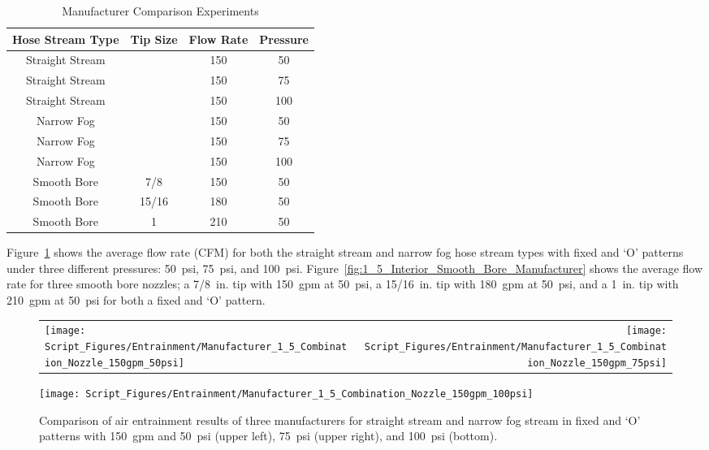 \documentclass[12pt,oneside]{book}
\begin{document}
\begin{table}[!ht]
\centering
\caption{Manufacturer Comparison Experiments}
\label{tab:Manufacturer_Comparison_Experiments}
\begin{tabular}{cccc}
\toprule[1.5pt]
Hose Stream Type & Tip Size & Flow Rate & Pressure \\ 
\midrule
Straight Stream &       & 150 & 50 \\
Straight Stream &       & 150 & 75 \\
Straight Stream &       & 150 & 100 \\
Narrow Fog      &       & 150 & 50 \\
Narrow Fog      &       & 150 & 75 \\
Narrow Fog      &       & 150 & 100 \\
Smooth Bore     & 7/8   & 150 & 50 \\
Smooth Bore     & 15/16 & 180 & 50 \\
Smooth Bore     & 1     & 210 & 50 \\
\bottomrule[1.25pt]
\end{tabular}
\end{table}

Figure~\ref{fig:1_5_Interior_Combination_Manufacturer} shows the average flow rate (CFM) for both the straight stream and narrow fog hose stream types with fixed and `O' patterns under three different pressures: 50~psi, 75~psi, and 100~psi. Figure~\ref{fig:1_5_Interior_Smooth_Bore_Manufacturer} shows the average flow rate for three smooth bore nozzles; a 7/8~in. tip with 150~gpm at 50~psi, a 15/16~in. tip with 180~gpm at 50~psi, and a 1~in. tip with 210~gpm at 50~psi for both a fixed and `O' pattern.

\begin{figure}[!ht]
\begin{tabular*}{\textwidth}{lr}
\texttt{[image: Script\_Figures/Entrainment/Manufacturer\_1\_5\_Combination\_Nozzle\_150gpm\_50psi]} &
\texttt{[image: Script\_Figures/Entrainment/Manufacturer\_1\_5\_Combination\_Nozzle\_150gpm\_75psi]} \\
\end{tabular*}
\centering
\texttt{[image: Script\_Figures/Entrainment/Manufacturer\_1\_5\_Combination\_Nozzle\_150gpm\_100psi]}
\caption[Average Air Entrainment Varying Manufacturer with Combination Nozzles]{Comparison of air entrainment results of three manufacturers for straight stream and narrow fog stream in fixed and `O' patterns with 150~gpm and 50~psi (upper left), 75~psi (upper right), and 100~psi (bottom).}
\label{fig:1_5_Interior_Combination_Manufacturer}
\end{figure}
\end{document}
